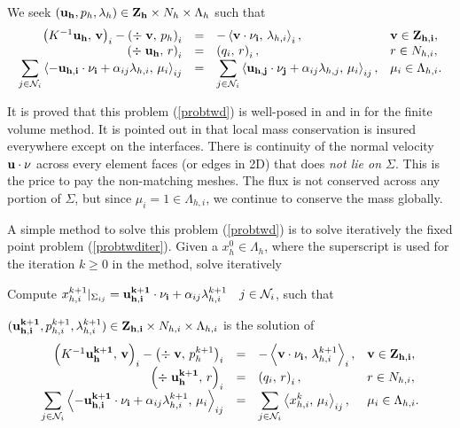 We seek $({\bf u_h}, p_h, \lambda_h) \in {\bf Z_h} \times N_h \times \Lambda_h$
such that
\begin{equation}\label{probtwd}\begin{array}{rcll}
\left( K^{-1}{\bf u_h},\, {\bf v} \right)_{i} - 
\left( \div\; {\bf v}, \, p_h \right)_{i}  & = & \displaystyle 
- \left< {\bf v \cdot  \nu_i} , \, \lambda_{h,i} \right>_{i},  & {\bf v} \in {\bf Z_{h,i}}, \\
\left( \div\; {\bf u_h}, \, r \right)_{i} &= &
 \left(q_i, \, r \right)_{i},  & r \in N_{h,i},\\
\displaystyle \sum_{j \in {\mathcal N}_{i}} \left< - {\bf u_{h,i} \cdot  \nu_i}  + 
\alpha_{ij} \lambda_{h,i}  , 
\, \mu_{i} \right>_{ij} & = & 
\displaystyle \sum_{j \in {\mathcal N}_{i}} \left< {\bf u_{h,j} \cdot  \nu_j}  + 
\alpha_{ij} \lambda_{h,j}  , 
\, \mu_{i} \right>_{ij},  & \mu_{i} \in \Lambda_{h,i}.\\
\end{array}\end{equation}

It is proved that this problem (\ref{probtwd}) is well-posed in
\cite{MR98j:76083} and in \cite{vfcement-1999} for the finite volume method. It
is pointed out in \cite{MR98j:76083} that local mass conservation is insured
everywhere except on the interfaces. There is continuity of the normal
velocity ${\bf u \cdot \nu}$ across every element faces (or edges in 2D) that
does \emph{not lie on $\Sigma$}. This is the price to pay the non-matching meshes. The
flux is not conserved across any portion of $\Sigma$, but since $\mu_i = 1 \in
\Lambda_{h,i}$, we continue to conserve the mass globally.

A simple method to solve this problem (\ref{probtwd}) is to solve iteratively
the fixed point problem (\ref{probtwditer}). Given a $x^{0}_{h} \in
\Lambda_{h}$, where the superscript is used for the iteration $k \geq 0$ in the
method, solve iteratively

Compute $x^{k+1}_{h,i}|_{\Sigma_{ij}} =  
{\bf u^{k+1}_{h,i} \cdot \nu_i}  + \alpha_{ij} \lambda^{k+1}_{h,i} 
\quad j \in {\mathcal N}_{i}$,  such that
 
$({\bf u^{k+1}_{h,i}}, p^{k+1}_{h,i}, \lambda^{k+1}_{h,i}) 
\in {\bf Z_{h,i}} \times N_{h,i} \times \Lambda_{h,i}$
is the solution of 
\begin{equation}\label{probtwditer}\begin{array}{rcll}
\left( K^{-1}{\bf u^{k+1}_h},\, {\bf v} \right)_{i} - 
\left( \div\; {\bf v}, \, p^{k+1}_h \right)_{i}  & = & \displaystyle 
- \left< {\bf v \cdot \nu_i} , \, \lambda^{k+1}_{h,i} \right>_{i},  & {\bf v} 
\in {\bf Z_{h,i}}, \\
\left( \div\; {\bf u^{k+1}_h}, \, r \right)_{i} &= &
 \left(q_i, \, r \right)_{i},  & r \in N_{h,i},\\
\displaystyle \sum_{j \in {\mathcal N}_{i}} \left< - {\bf u^{k+1}_{h,i} \cdot \nu_i}  + 
\alpha_{ij} \lambda^{k+1}_{h,i}  , 
\, \mu_{i} \right>_{ij} & = & 
\displaystyle \sum_{j \in {\mathcal N}_{i}} \left< x^{k}_{h,i}  , 
\, \mu_{i} \right>_{ij},  & \mu_{i} \in \Lambda_{h,i}.\\
\end{array}\end{equation}


